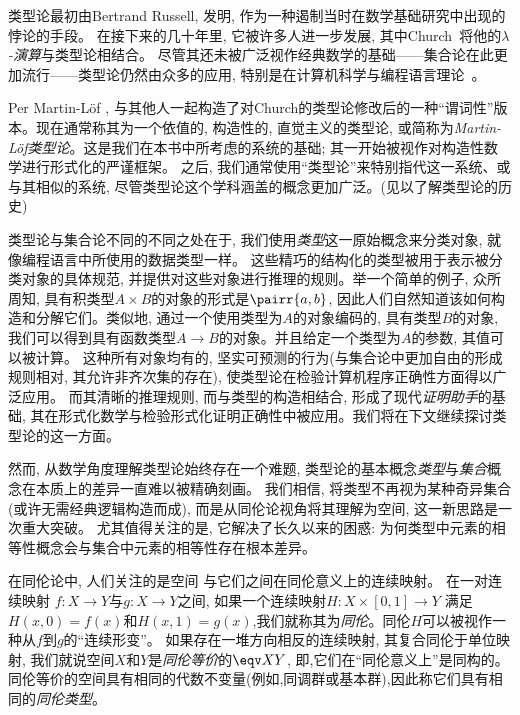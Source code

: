 类型论最初由Bertrand Russell\cite{Russell:1908}, 发明, 作为一种遏制当时在数学基础研究中出现的悖论的手段。
在接下来的几十年里, 它被许多人进一步发展, 其中Church~\cite{Church:1940tu, Church:1941tc}将他的\textit{$\lambda$-演算}与类型论相结合。
尽管其还未被广泛视作经典数学的基础——集合论在此更加流行——类型论仍然由众多的应用, 特别是在计算机科学与编程语言理论~\cite{Pierce-TAPL}。

%
%
%

Per Martin-L\"{o}f \cite{Martin-Lof-1972,Martin-Lof-1973,Martin-Lof-1979,martin-lof:bibliopolis}, 
与其他人一起构造了对Church的类型论修改后的一种``谓词性''版本。现在通常称其为一个依值的, 构造性的, 直觉主义的类型论, 
或简称为\emph{Martin\--L\"of类型论}。这是我们在本书中所考虑的系统的基础; 其一开始被视作对构造性数学进行形式化的严谨框架。
之后, 我们通常使用``类型论''来特别指代这一系统、或与其相似的系统, 尽管类型论这个学科涵盖的概念更加广泛。(见\cite{somma, kamar}以了解类型论的历史)

类型论与集合论不同的不同之处在于, 我们使用\emph{类型}这一原始概念来分类对象, 就像编程语言中所使用的数据类型一样。
这些精巧的结构化的类型被用于表示被分类对象的具体规范, 并提供对这些对象进行推理的规则。举一个简单的例子, 
众所周知, 具有积类型$A \times B$的对象的形式是$\pairr{a, b}$, 因此人们自然知道该如何构造和分解它们。类似地, 通过一个使用类型为$A$的对象编码的, 
具有类型$B$的对象, 我们可以得到具有函数类型$A \to B$的对象。并且给定一个类型为$A$的参数, 其值可以被计算。
这种所有对象均有的, 坚实可预测的行为(与集合论中更加自由的形成规则相对, 其允许非齐次集的存在), 使类型论在检验计算机程序正确性方面得以广泛应用。
而其清晰的推理规则, 而与类型的构造相结合, 形成了现代\emph{证明助手}的基础, 
%
%
其在形式化数学与检验形式化证明正确性中被应用。我们将在下文继续探讨类型论的这一方面。

然而, 从数学角度理解类型论始终存在一个难题, 类型论的基本概念\emph{类型}与\emph{集合}概念在本质上的差异一直难以被精确刻画。
我们相信, 将类型不再视为某种奇异集合(或许无需经典逻辑构造而成), 而是从同伦论视角将其理解为空间, 这一新思路是一次重大突破。
尤其值得关注的是, 它解决了长久以来的困惑: 为何类型中元素的相等性概念会与集合中元素的相等性存在根本差异。

在同伦论中, 人们关注的是空间
%
与它们之间在同伦意义上的连续映射。
%
在一对连续映射 $f : X \to Y$与$g : X\to Y$之间, 如果一个连续映射$H : X \times [0,  1] \to Y$
满足$H(x, 0) = f (x)$和$H(x, 1) = g(x)$,我们就称其为\emph{同伦}。同伦$H$可以被视作一种从$f$到$g$的``连续形变''。
%
如果存在一堆方向相反的连续映射, 其复合同伦于单位映射, 我们就说空间$X$和$Y$是\emph{同伦等价}的$\eqv X Y$,
%
即,它们在``同伦意义上''是同构的。同伦等价的空间具有相同的代数不变量(例如,同调群或基本群),因此称它们具有相同的\emph{同伦类型}。

